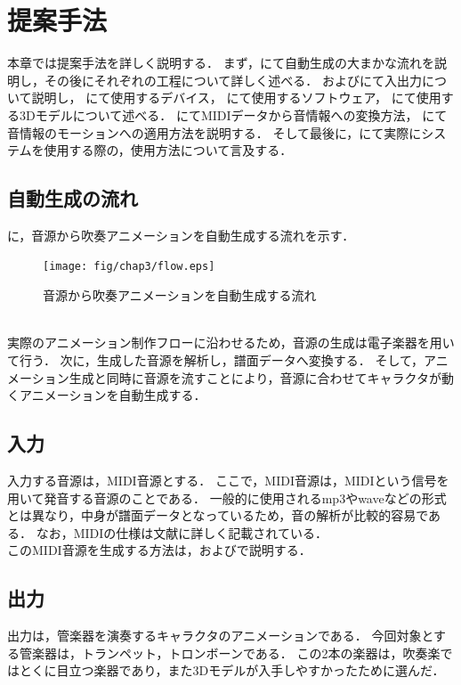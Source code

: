 \chapter{提案手法} \label{chap:algorithm}
本章では提案手法を詳しく説明する．
まず，にて自動生成の大まかな流れを説明し，その後にそれぞれの工程について詳しく述べる．
およびにて入出力について説明し，
にて使用するデバイス，
にて使用するソフトウェア，
にて使用する3Dモデルについて述べる．
にてMIDIデータから音情報への変換方法，
にて音情報のモーションへの適用方法を説明する．
そして最後に，にて実際にシステムを使用する際の，使用方法について言及する．

\section{自動生成の流れ} \label{sec:flow}
に，音源から吹奏アニメーションを自動生成する流れを示す．\\
\begin{figure}[!h]
	\centering
	\texttt{[image: fig/chap3/flow.eps]}
	\caption{音源から吹奏アニメーションを自動生成する流れ}
	\label{fig:flow}
\end{figure}
\\
\indent
実際のアニメーション制作フローに沿わせるため，音源の生成は電子楽器を用いて行う．
次に，生成した音源を解析し，譜面データへ変換する．
そして，アニメーション生成と同時に音源を流すことにより，音源に合わせてキャラクタが動くアニメーションを自動生成する．

\section{入力} \label{sec:input}
入力する音源は，MIDI音源とする．
ここで，MIDI音源は，MIDIという信号を用いて発音する音源のことである．
一般的に使用されるmp3やwaveなどの形式とは異なり，中身が譜面データとなっているため，音の解析が比較的容易である．
なお，MIDIの仕様は文献\cite{midi}に詳しく記載されている．\\
\indent
このMIDI音源を生成する方法は，およびで説明する．

\section{出力} \label{sec:output}
出力は，管楽器を演奏するキャラクタのアニメーションである．
今回対象とする管楽器は，トランペット，トロンボーンである．
この2本の楽器は，吹奏楽ではとくに目立つ楽器であり，また3Dモデルが入手しやすかったために選んだ．

